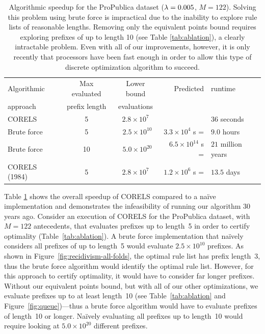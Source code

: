 \begin{table}[t!]
\centering
\begin{tabular}{l|c|c|r l}
Algorithmic & Max evaluated & Lower bound & Predicted&runtime \\
approach & prefix length & evaluations & \\
\hline
CORELS & 5  & $ 2.8 \times 10^7$ & &$36$ seconds \\
Brute force & 5 & ~$2.5 \times 10^{10}$ & $3.3 \times 10^4$ s =&$9.0$ hours \\
Brute force & 10 & ~$5.0 \times 10^{20}$ & $6.5 \times 10^{14}$ s =&$21$ million years \\
CORELS (1984) & 5 & $2.8 \times 10^7$ & $1.2 \times 10^6$ s =&$13.5$ days \\
\end{tabular}
\caption{Algorithmic speedup for the ProPublica dataset (${{\lambda} = 0.005}$, ${M = 122}$).
%
Solving this problem using brute force is impractical due to the inability to explore rule lists of reasonable lengths.
%
Removing only the equivalent points bound requires exploring prefixes of up to length 10 (see Table \ref{tab:ablation}), a clearly intractable problem.
%
Even with all of our improvements, however, it is only recently that processors have been fast enough in order to allow this type of discrete optimization algorithm to succeed.
}
\label{tab:speedup}
\end{table}

Table \ref{tab:speedup} shows the overall speedup of CORELS compared to a na\"ive implementation
and demonstrates the infeasibility of running our algorithm 30 years ago.
%
Consider an execution of CORELS for the ProPublica dataset, with ${M = 122}$ antecedents,
that evaluates prefixes up to length~5 in order to certify optimality (Table~\ref{tab:ablation}).
%
A brute force implementation that na\"ively considers all prefixes of up to length~5
would evaluate ${2.5 \times 10^{10}}$ prefixes.
%
As shown in Figure~\ref{fig:recidivism-all-folds}, the optimal rule list has prefix length~3,
thus the brute force algorithm would identify the optimal rule list.
%
However, for this approach to certify optimality, it would have to consider far longer prefixes.
%
Without our equivalent points bound, but with all of our other optimizations,
we evaluate prefixes up to at least length~10
(see Table~\ref{tab:ablation} and Figure~\ref{fig:queue})---thus a brute force algorithm
would have to evaluate prefixes of length~10 or longer.
%
Na\"ively evaluating all prefixes up to length~10 would require looking at ${5.0 \times 10^{20}}$ different prefixes.

